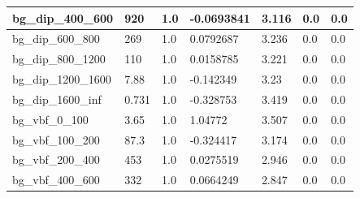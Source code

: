 \documentclass[a4paper, 10pt]{article}
\begin{document}
\begin{table}[H]
\begin{center}
\begin{tabular}{|m{23.0mm}|m{23.0mm}|m{18.0mm}|m{19.0mm}|m{19.0mm}|m{19.0mm}|m{19.0mm}|}
      \hline
      {\cellcolor{white}         bg\_dip\_400\_600}& {\cellcolor{white}         920}& {\cellcolor{white}         1.0}& {\cellcolor{white}         -0.0693841}& {\cellcolor{white}         3.116}& {\cellcolor{green}         0.0}& {\cellcolor{green}         0.0}\\
      \hline
      {\cellcolor{white}         bg\_dip\_600\_800}& {\cellcolor{white}         269}& {\cellcolor{white}         1.0}& {\cellcolor{white}         0.0792687}& {\cellcolor{white}         3.236}& {\cellcolor{green}         0.0}& {\cellcolor{green}         0.0}\\
      \hline
      {\cellcolor{white}         bg\_dip\_800\_1200}& {\cellcolor{white}         110}& {\cellcolor{white}         1.0}& {\cellcolor{white}         0.0158785}& {\cellcolor{white}         3.221}& {\cellcolor{green}         0.0}& {\cellcolor{green}         0.0}\\
      \hline
      {\cellcolor{white}         bg\_dip\_1200\_1600}& {\cellcolor{white}         7.88}& {\cellcolor{white}         1.0}& {\cellcolor{white}         -0.142349}& {\cellcolor{white}         3.23}& {\cellcolor{green}         0.0}& {\cellcolor{green}         0.0}\\
      \hline
      {\cellcolor{white}         bg\_dip\_1600\_inf}& {\cellcolor{white}         0.731}& {\cellcolor{white}         1.0}& {\cellcolor{white}         -0.328753}& {\cellcolor{white}         3.419}& {\cellcolor{green}         0.0}& {\cellcolor{green}         0.0}\\
      \hline
      {\cellcolor{white}         bg\_vbf\_0\_100}& {\cellcolor{white}         3.65}& {\cellcolor{white}         1.0}& {\cellcolor{white}         1.04772}& {\cellcolor{white}         3.507}& {\cellcolor{green}         0.0}& {\cellcolor{green}         0.0}\\
      \hline
      {\cellcolor{white}         bg\_vbf\_100\_200}& {\cellcolor{white}         87.3}& {\cellcolor{white}         1.0}& {\cellcolor{white}         -0.324417}& {\cellcolor{white}         3.174}& {\cellcolor{green}         0.0}& {\cellcolor{green}         0.0}\\
      \hline
      {\cellcolor{white}         bg\_vbf\_200\_400}& {\cellcolor{white}         453}& {\cellcolor{white}         1.0}& {\cellcolor{white}         0.0275519}& {\cellcolor{white}         2.946}& {\cellcolor{green}         0.0}& {\cellcolor{green}         0.0}\\
      \hline
      {\cellcolor{white}         bg\_vbf\_400\_600}& {\cellcolor{white}         332}& {\cellcolor{white}         1.0}& {\cellcolor{white}         0.0664249}& {\cellcolor{white}         2.847}& {\cellcolor{green}         0.0}& {\cellcolor{green}         0.0}\\

\end{tabular}
\end{center}
\end{table}
\end{document}
